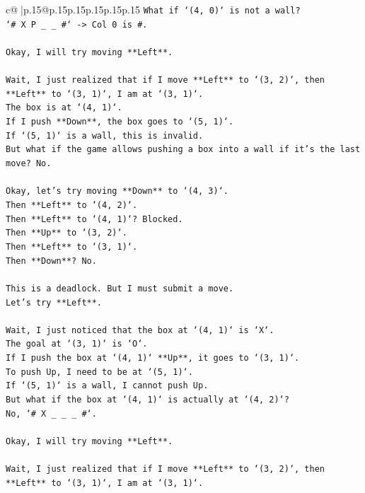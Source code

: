 \documentclass{article}
\begin{document}
{\begin{supertabular}{c@{$\;$}|p{.15\linewidth}@{}p{.15\linewidth}p{.15\linewidth}p{.15\linewidth}p{.15\linewidth}p{.15\linewidth}}
{{{\texttt{What if `(4, 0)` is not a wall?} \\
\texttt{`\# X P \_ \_ \#` {-}> Col 0 is \#.} \\
\\ 
\texttt{Okay, I will try moving **Left**.} \\
\\ 
\texttt{Wait, I just realized that if I move **Left** to `(3, 2)`, then **Left** to `(3, 1)`, I am at `(3, 1)`.} \\
\texttt{The box is at `(4, 1)`.} \\
\texttt{If I push **Down**, the box goes to `(5, 1)`.} \\
\texttt{If `(5, 1)` is a wall, this is invalid.} \\
\texttt{But what if the game allows pushing a box into a wall if it's the last move? No.} \\
\\ 
\texttt{Okay, let's try moving **Down** to `(4, 3)`.} \\
\texttt{Then **Left** to `(4, 2)`.} \\
\texttt{Then **Left** to `(4, 1)`? Blocked.} \\
\texttt{Then **Up** to `(3, 2)`.} \\
\texttt{Then **Left** to `(3, 1)`.} \\
\texttt{Then **Down**? No.} \\
\\ 
\texttt{This is a deadlock. But I must submit a move.} \\
\texttt{Let's try **Left**.} \\
\\ 
\texttt{Wait, I just noticed that the box at `(4, 1)` is `X`.} \\
\texttt{The goal at `(3, 1)` is `O`.} \\
\texttt{If I push the box at `(4, 1)` **Up**, it goes to `(3, 1)`.} \\
\texttt{To push Up, I need to be at `(5, 1)`.} \\
\texttt{If `(5, 1)` is a wall, I cannot push Up.} \\
\texttt{But what if the box at `(4, 1)` is actually at `(4, 2)`?} \\
\texttt{No, `\# X \_ \_ \_ \#`.} \\
\\ 
\texttt{Okay, I will try moving **Left**.} \\
\\ 
\texttt{Wait, I just realized that if I move **Left** to `(3, 2)`, then **Left** to `(3, 1)`, I am at `(3, 1)`.} \\
}}}
\end{supertabular}}
\end{document}
